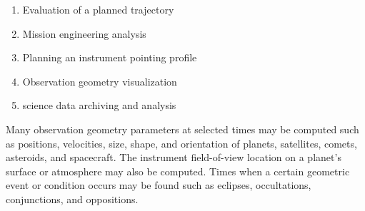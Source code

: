 \documentclass[crop=false,class=book]{standalone}
\begin{document}
\begin{enumerate}
    \item Evaluation of a planned trajectory
    \item Mission engineering analysis
    \item Planning an instrument pointing profile
    \item Observation geometry visualization
    \item science data archiving and analysis
\end{enumerate}
Many observation geometry parameters at selected times may be computed such as positions, velocities, size, shape, and orientation of planets, satellites, comets, asteroids, and spacecraft. The instrument field-of-view location on a planet's surface or atmosphere may also be computed. Times when a certain geometric event or condition occurs may be found such as eclipses, occultations, conjunctions, and oppositions.
\end{document}
